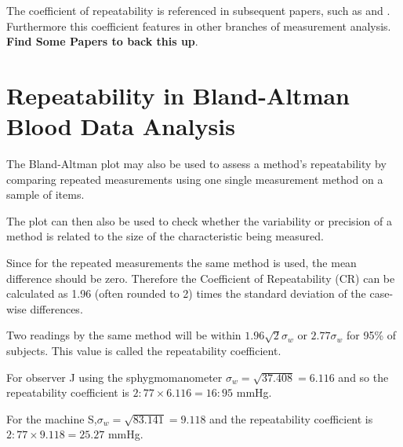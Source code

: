 \documentclass[12pt, a4paper]{report}
\theoremstyle{plain}
\theoremstyle{definition}
\theoremstyle{remark}
\begin{document}
	
The coefficient of repeatability is referenced in subsequent papers, such as \citet{BXC2008} and \citet{ARoy2009}. Furthermore this coefficient features in other branches of measurement analysis. 
\textbf{Find Some Papers to back this up}.

\section{Repeatability in Bland-Altman Blood Data Analysis}

The Bland-Altman plot may also be used to assess a method's repeatability by comparing repeated measurements using one single measurement method on a sample of items.

The plot can then also be used to check whether the variability or precision of a method is related to the size of the characteristic being measured.

Since for the repeated measurements the same method is used, the mean difference should be zero.
Therefore the Coefficient of Repeatability (CR) can be calculated as 1.96 (often rounded to 2) times the standard deviation of the case-wise differences.


 Two readings by the same method will be within $1.96
		\sqrt{2} \sigma_w $ or $2.77 \sigma_w $ for 95\% of subjects. This value is called the repeatability coefficient.
		
		For observer J using the sphygmomanometer $ \sigma_w = \sqrt{37.408} = 6.116$ and so the repeatability coefficient is
		$2:77 \times 6.116 = 16:95$ mmHg.
		
		 For the machine S,$ \sigma_w = \sqrt{83.141} = 9.118$ and the repeatability coefficient is $2:77 \times 9.118 = 25.27$ mmHg.
		
	
	
	
	
	
	
\end{document}
